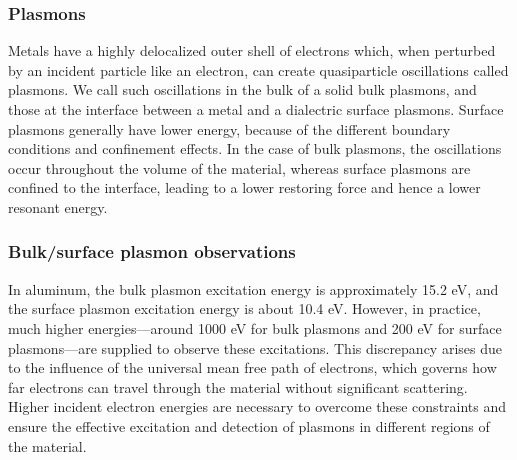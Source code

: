 \documentclass[12pt]{article}
\begin{document}
\subsubsection{Plasmons}

Metals have a highly delocalized outer shell of electrons which, when perturbed by an incident particle like an electron, can create quasiparticle oscillations called plasmons. We call such oscillations in the bulk of a solid bulk plasmons, and those at the interface between a metal and a dialectric surface plasmons. Surface plasmons generally have lower energy, because of the different boundary conditions and confinement effects. In the case of bulk plasmons, the oscillations occur throughout the volume of the material, whereas surface plasmons are confined to the interface, leading to a lower restoring force and hence a lower resonant energy.
\subsubsection{Bulk/surface plasmon observations}

In aluminum, the bulk plasmon excitation energy is approximately 15.2 eV, and the surface plasmon excitation energy is about 10.4 eV. However, in practice, much higher energies—around 1000 eV for bulk plasmons and 200 eV for surface plasmons—are supplied to observe these excitations. This discrepancy arises due to the influence of the universal mean free path of electrons, which governs how far electrons can travel through the material without significant scattering. Higher incident electron energies are necessary to overcome these constraints and ensure the effective excitation and detection of plasmons in different regions of the material.
\end{document}

